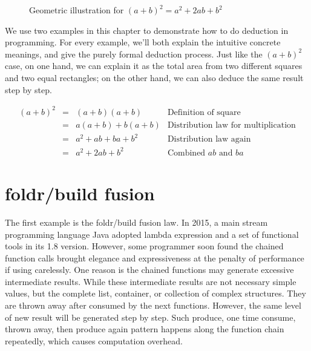 \documentclass{article}
\begin{document}
\begin{figure}[htbp]
\centering
{}
\caption{Geometric illustration for $(a + b)^2 = a^2 + 2ab + b^2$}
\end{figure}

We use two examples in this chapter to demonstrate how to do deduction in programming. For every example, we'll both explain the intuitive concrete meanings, and give the purely formal deduction process. Just like the $(a+b)^2$ case, on one hand, we can explain it as the total area from two different squares and two equal rectangles; on the other hand, we can also deduce the same result step by step.

\[
\begin{array}{rcll}
(a + b)^2 & = & (a + b)(a + b) & \text{Definition of square} \\
          & = & a(a + b) + b(a + b) & \text{Distribution law for multiplication} \\
          & = & a^2 + ab + ba + b^2 & \text{Distribution law again} \\
          & = & a^2 + 2ab + b^2 & \text{Combined $ab$ and $ba$}
\end{array}
\]

\section{foldr/build fusion}

The first example is the foldr/build fusion law. In 2015, a main stream programming language Java adopted lambda expression and a set of functional tools in its 1.8 version. However, some programmer soon found the chained function calls brought elegance and expressiveness at the penalty of performance if using carelessly. One reason is the chained functions may generate excessive intermediate results. While these intermediate results are not necessary simple values, but the complete list, container, or collection of complex structures. They are thrown away after consumed by the next functions. However, the same level of new result will be generated step by step. Such produce, one time consume, thrown away, then produce again pattern happens along the function chain repeatedly, which causes computation overhead.
\end{document}
